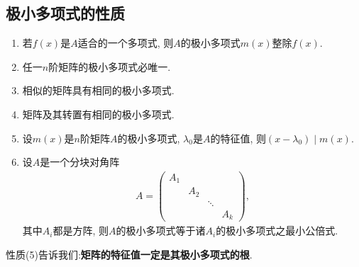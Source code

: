 \documentclass[../../main.tex]{subfiles}
\begin{document}
\subsection{极小多项式的性质}

\begin{proposition}[极小多项式的性质]\label{proposition:极小多项式的性质}
\begin{enumerate}[(1)]
\item 若$f(x)$是$A$适合的一个多项式, 则$A$的极小多项式$m(x)$整除$f(x)$.

\item 任一$n$阶矩阵的极小多项式必唯一.

\item 相似的矩阵具有相同的极小多项式.

\item 矩阵及其转置有相同的极小多项式.

\item 设$m(x)$是$n$阶矩阵$A$的极小多项式, $\lambda_0$是$A$的特征值, 则$(x - \lambda_0) \mid m(x)$.

\item 设$A$是一个分块对角阵
\begin{align*}
A = \begin{pmatrix}
A_1 & & \\
& A_2 & \\
& & \ddots & \\
& & & A_k
\end{pmatrix},
\end{align*}
其中$A_i$都是方阵, 则$A$的极小多项式等于诸$A_i$的极小多项式之最小公倍式.
\end{enumerate}
\end{proposition}
\begin{note}
性质(5)告诉我们:\textbf{矩阵的特征值一定是其极小多项式的根}.
\end{note}
\end{document}
